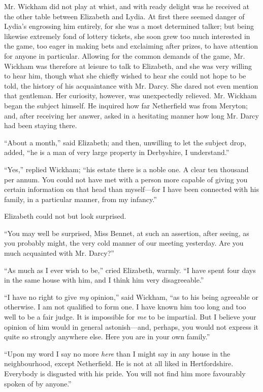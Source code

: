 \documentclass[12pt]{book}
\begin{document}
Mr. Wickham did not play at whist, and with ready delight was he received at the other table between Elizabeth and Lydia. At first there seemed danger of Lydia's engrossing him entirely, for she was a most determined talker; but being likewise extremely fond of lottery tickets, she soon grew too much interested in the game, too eager in making bets and exclaiming after prizes, to have attention for anyone in particular. Allowing for the common demands of the game, Mr. Wickham was therefore at leisure to talk to Elizabeth, and she was very willing to hear him, though what she chiefly wished to hear she could not hope to be told, the history of his acquaintance with Mr. Darcy. She dared not even mention that gentleman. Her curiosity, however, was unexpectedly relieved. Mr. Wickham began the subject himself. He inquired how far Netherfield was from Meryton; and, after receiving her answer, asked in a hesitating manner how long Mr. Darcy had been staying there.

``About a month,'' said Elizabeth; and then, unwilling to let the subject drop, added, ``he is a man of very large property in Derbyshire, I understand.''

``Yes,'' replied Wickham; ``his estate there is a noble one. A clear ten thousand per annum. You could not have met with a person more capable of giving you certain information on that head than myself---for I have been connected with his family, in a particular manner, from my infancy.''

Elizabeth could not but look surprised.

``You may well be surprised, Miss Bennet, at such an assertion, after seeing, as you probably might, the very cold manner of our meeting yesterday. Are you much acquainted with Mr. Darcy?''

``As much as I ever wish to be,'' cried Elizabeth, warmly. ``I have spent four days in the same house with him, and I think him very disagreeable.''

``I have no right to give \textit{my} opinion,'' said Wickham, ``as to his being agreeable or otherwise. I am not qualified to form one. I have known him too long and too well to be a fair judge. It is impossible for \textit{me} to be impartial. But I believe your opinion of him would in general astonish---and, perhaps, you would not express it quite so strongly anywhere else. Here you are in your own family.''

``Upon my word I say no more \textit{here} than I might say in any house in the neighbourhood, except Netherfield. He is not at all liked in Hertfordshire. Everybody is disgusted with his pride. You will not find him more favourably spoken of by anyone.''
\end{document}

